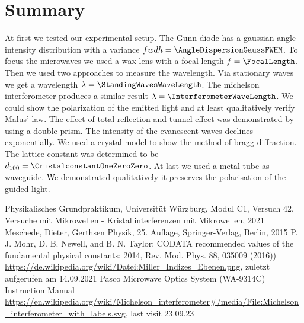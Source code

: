 \documentclass[a4paper,10pt,twocolumn]{article}
\begin{document}
    \section{Summary}
    
    At first we tested our experimental setup.
    The Gunn diode has a gaussian angle-intensity distribution with a variance $fwdh = \AngleDispersionGaussFWHM$.
    To focus the microwaves we used a wax lens with a focal length $f = \FocalLength$.
    Then we used two approaches to measure the wavelength. 
    Via stationary waves we get a wavelength $\lambda = \StandingWavesWaveLength$.
    The michelson interferometer produces a similar result $\lambda = \InterferometerWaveLength $.
    We could show the polarization of the emitted light and at least qualitatively verify Malus' law. 
    The effect of total reflection and tunnel effect was demonstrated by using a double prism.
    The intensity of the evanescent waves declines exponentially.
    We used a crystal model to show the method of bragg diffraction.
    The lattice constant was determined to be $d_{100} = \CristalconstantOneZeroZero$.
    At last we used a metal tube as waveguide.
    We demonstrated qualitatively it preserves the polarisation of the guided light.
    
    
    \begin{thebibliography}{}    %
         Physikalisches Grundpraktikum, Universitüt Würzburg, Modul C1, Versuch 42, Versuche mit Mikrowellen - Kristallinterferenzen mit Mikrowellen, 2021
         Meschede, Dieter, Gerthsen Physik, 25. Auflage, Springer-Verlag, Berlin, 2015
         P. J. Mohr, D. B. Newell, and B. N. Taylor: \grqq CODATA
        recommended values of the fundamental physical constants: 2014\grqq , Rev. Mod. Phys.
        88, 035009 (2016))
         \url{https://de.wikipedia.org/wiki/Datei:Miller_Indizes_Ebenen.png}, zuletzt aufgerufen am 14.09.2021
         Pasco Microwave Optics System (WA-9314C) Instruction Manual
         \url{https://en.wikipedia.org/wiki/Michelson_interferometer#/media/File:Michelson_interferometer_with_labels.svg}, last visit 23.09.23
    \end{thebibliography}
    
\end{document}
